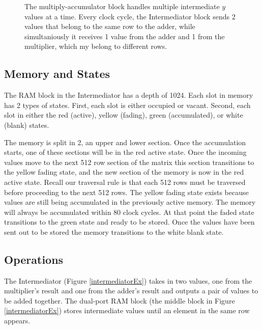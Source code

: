 \begin{figure}

\caption[The multiply-accumulator with an Intermediator.]{The multiply-accumulator block handles multiple intermediate $y$ values at a time. Every clock cycle, the Intermediator block sends 2 values that belong to the same row to the adder, while simultaniously it receives 1 value from the adder and 1 from the multiplier, which my belong to different rows.}
\label{fig:mac}
\end{figure}
\subsection{Memory and States}
The RAM block in the Intermediator has a depth of 1024. Each slot in memory has 2 types of states. First, each slot is either occupied or vacant. Second, each slot in either the red (active), yellow (fading), green (accumulated), or white (blank) states.

The memory is split in 2, an upper and lower section. Once the accumulation starts, one of these sections will be in the red active state. Once the incoming values move to the next 512 row section of the matrix this section transitions to the yellow fading state, and the new section of the memory is now in the red active state. Recall our traversal rule is that each 512 rows must be traversed before proceeding to the next 512 rows. The yellow fading state exists because values are still being accumulated in the previously active memory. The memory will always be accumulated within 80 clock cycles. At that point the faded state transitions to the green state and ready to be stored. Once the values have been sent out to be stored the memory transitions to the white blank state.

\subsection{Operations}
The Intermediator (Figure \ref{intermediatorEx}) takes in two values, one from the multiplier's result and one from the adder's result and outputs a pair of values to be added together. The dual-port RAM block (the middle block in Figure \ref{intermediatorEx}) stores intermediate values until an element in the same row appears. \par

